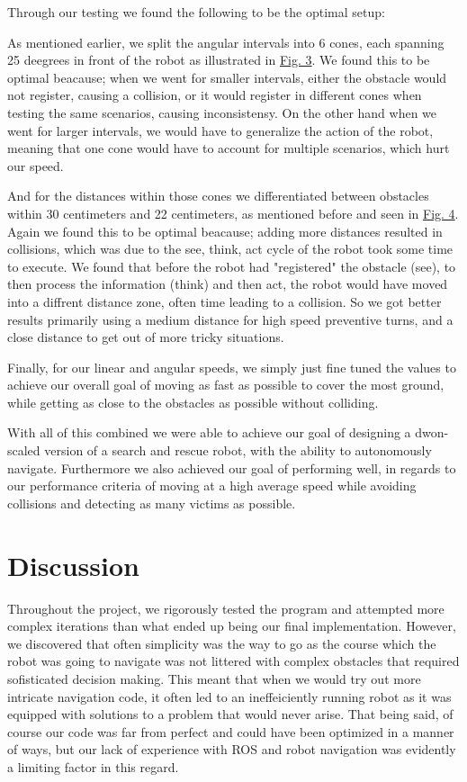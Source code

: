 \documentclass[conference]{IEEEtran}
\begin{document}
Through our testing we found the following to be the optimal setup:

As mentioned earlier, we split the angular intervals into 6 cones, each spanning 25 deegrees in front of the robot as illustrated in \href{sec:angles}{Fig. 3}.
We found this to be optimal beacause; when we went for smaller intervals, either the obstacle would not register, causing a collision, or it would register in different cones when testing the same scenarios, causing inconsistensy.
On the other hand when we went for larger intervals, we would have to generalize the action of the robot, meaning that one cone would have to account for multiple scenarios, which hurt our speed.

And for the distances within those cones we differentiated between obstacles within 30 centimeters and 22 centimeters, as mentioned before and seen in \href{sec:distances}{Fig. 4}.
Again we found this to be optimal beacause; adding more distances resulted in collisions, which was due to the see, think, act cycle of the robot took some time to execute.
We found that before the robot had "registered" the obstacle (see), to then process the information (think) and then act, the robot would have moved into a diffrent distance zone, often time leading to a collision.
So we got better results primarily using a medium distance for high speed preventive turns, and a close distance to get out of more tricky situations.

Finally, for our linear and angular speeds, we simply just fine tuned the values to achieve our overall goal of moving as fast as possible to cover the most ground, while getting as close to the obstacles as possible without colliding.

With all of this combined we were able to achieve our goal of designing a dwon-scaled version of a search and rescue robot, with the ability to autonomously navigate.
Furthermore we also achieved our goal of performing well, in regards to our performance criteria of moving at a high average speed while avoiding collisions and detecting as many victims as possible.

\section{Discussion}
Throughout the project, we rigorously tested the program and attempted more complex iterations than what ended up being our final implementation.
However, we discovered that often simplicity was the way to go as the course which the robot was going to navigate was not littered with complex obstacles that required sofisticated decision making.
This meant that when we would try out more intricate navigation code, it often led to an ineffeiciently running robot as it was equipped with solutions to a problem that would never arise.
That being said, of course our code was far from perfect and could have been optimized in a manner of ways, but our lack of experience with ROS and robot navigation was evidently a limiting factor in this regard.
\end{document}
